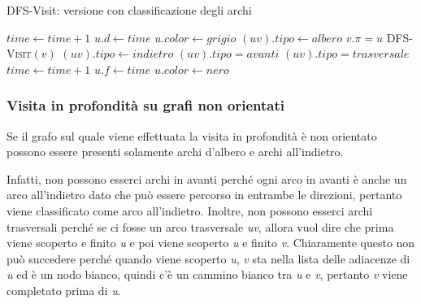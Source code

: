 \begin{breakablealgorithm}
	\caption{DFS-Visit: versione con classificazione degli archi}
	\begin{algorithmic}[1]
			\State $ time \gets time + 1 $
			\State $ u.d \gets time $
			\State $ u.color \gets grigio $
					\State $(uv).tipo \gets albero$ 
					\State $ v.\pi = u $
					\State \textsc{DFS-Visit}$ (v) $  
				\EndIf
					\State $(uv).tipo \gets indietro$ 
				\EndIf
						\State $ (uv).tipo = avanti  $ 
					\EndIf
					\State $ (uv).tipo = trasversale  $  
					\EndIf
				\EndIf
			\EndFor
			\State $ time \gets time + 1 $
			\State $ u.f \gets time $
			\State $ u.color \gets nero $
		\EndFunction
	\end{algorithmic}
\end{breakablealgorithm}

\subsubsection{Visita in profondità su grafi non orientati}\label{visita-in-profondituxe0-su-grafi-orientati}

Se il grafo sul quale viene effettuata la visita in profondità è non
orientato possono essere presenti solamente archi d'albero e archi
all'indietro.

Infatti, non possono esserci archi in avanti perché ogni arco in avanti è anche un arco all'indietro dato che può essere percorso in entrambe le direzioni, pertanto viene classificato come arco all'indietro.
Inoltre, non possono esserci archi trasversali perché se ci fosse un arco trasversale \textit{uv}, allora vuol dire che prima viene scoperto e finito \textit{u} e poi viene scoperto \textit{u} e finito \textit{v}. Chiaramente questo non può succedere perché quando viene scoperto \textit{u}, \textit{v} sta nella lista delle adiacenze di \textit{u} ed è un nodo bianco, quindi c'è un cammino bianco tra \textit{u} e \textit{v}, pertanto \textit{v} viene completato prima di \textit{u}.


